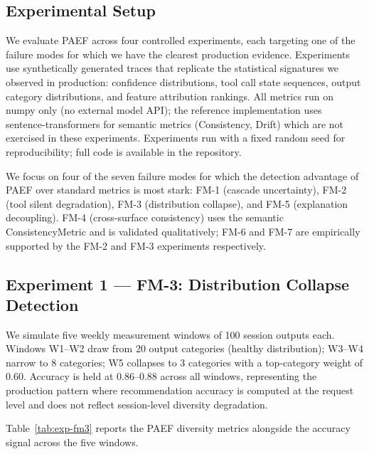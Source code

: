 \documentclass{article}
\begin{document}
\subsection{Experimental Setup}
\label{sec:exp-setup}

We evaluate PAEF across four controlled experiments, each targeting one of
the failure modes for which we have the clearest production evidence.
Experiments use synthetically generated traces that replicate the statistical
signatures we observed in production: confidence distributions, tool call
state sequences, output category distributions, and feature attribution
rankings.  All metrics run on numpy only (no external model API); the
reference implementation uses sentence-transformers for semantic metrics
(Consistency, Drift) which are not exercised in these experiments.
Experiments run with a fixed random seed for reproducibility; full code
is available in the repository.

We focus on four of the seven failure modes for which the detection
advantage of PAEF over standard metrics is most stark:
FM-1 (cascade uncertainty), FM-2 (tool silent degradation),
FM-3 (distribution collapse), and FM-5 (explanation decoupling).
FM-4 (cross-surface consistency) uses the semantic ConsistencyMetric
and is validated qualitatively; FM-6 and FM-7 are empirically supported
by the FM-2 and FM-3 experiments respectively.

\subsection{Experiment 1 — FM-3: Distribution Collapse Detection}
\label{sec:exp-fm3}

We simulate five weekly measurement windows of 100 session outputs each.
Windows W1--W2 draw from 20 output categories (healthy distribution); W3--W4
narrow to 8 categories; W5 collapses to 3 categories with a top-category
weight of 0.60.  Accuracy is held at 0.86--0.88 across all windows,
representing the production pattern where recommendation accuracy is computed
at the request level and does not reflect session-level diversity degradation.

Table~\ref{tab:exp-fm3} reports the PAEF diversity metrics alongside the
accuracy signal across the five windows.
\end{document}
